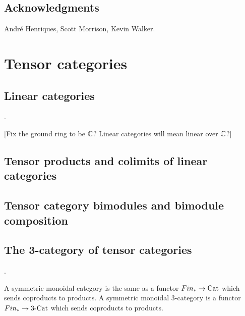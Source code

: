 \documentclass{amsart}
\begin{document}
\subsection*{Acknowledgments}
Andr\'e Henriques, Scott Morrison, Kevin Walker.



\section{Tensor categories} \label{sec-tc}



\subsection{Linear categories} \label{sec-tc-lincat}
.

[Fix the ground ring to be $\mathbb C$?  Linear categories will mean linear over $\mathbb C$?]

\subsection{Tensor products and colimits of linear categories} \label{sec-tc-tensorprod}

\subsection{Tensor category bimodules and bimodule composition} \label{sec-tc-bimod}

\subsection{The 3-category of tensor categories} \label{sec-tc-threecat}
.


A symmetric monoidal category is the same as a functor $Fin_* \to \mathrm{Cat}$ which sends coproducts to products. A symmetric monoidal 3-category is a functor $Fin_* \to 3\text{-}\mathrm{Cat}$ which sends coproducts to products.
\end{document}
